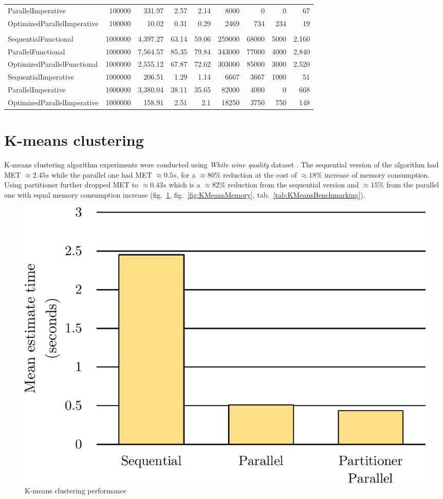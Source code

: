 \begin{table}
\begin{tabularx}{\linewidth}{Xrrrrrrrr}
ParallelImperative	&	100000	&	331.97	&	2.57	&	2.14	&	8000	&	0	&	0	&	67	\\
OptimizedParallelImperative	&	100000	&	10.02	&	0.31	&	0.29	&	2469	&	734	&	234	&	19	\\
&&&&&&&&\\
SequentialFunctional	&	1000000	&	4,397.27	&	63.14	&	59.06	&	259000	&	68000	&	5000	&	2,160	\\
ParallelFunctional	&	1000000	&	7,564.57	&	85.35	&	79.84	&	343000	&	77000	&	4000	&	2,840	\\
OptimizedParallelFunctional	&	1000000	&	2,555.12	&	67.87	&	72.62	&	303000	&	85000	&	3000	&	2,520	\\
SequentialImperative	&	1000000	&	206.51	&	1.29	&	1.14	&	6667	&	3667	&	1000	&	51	\\
ParallelImperative	&	1000000	&	3,380.04	&	38.11	&	35.65	&	82000	&	4000	&	0	&	668	\\
OptimizedParallelImperative	&	1000000	&	158.91	&	2.51	&	2.1	&	18250	&	3750	&	750	&	148	\\
			\bottomrule
    \end{tabularx}
\end{table}

\clearpage
\section{K-means clustering}
\label{sec: K-means}
K-means clustering algorithm experiments were conducted using \emph{White 
wine quality} dataset \cite{WhiteWine}. The sequential version of the algorithm 
had MET $\approx 2.45s$ while the parallel one had MET $\approx 0.5s$, for a $
\approx 80\%$ reduction at the cost of $\approx 18\%$ increase of memory 
consumption. Using partitioner further dropped MET to $\approx 0.43s$
 which is a $\approx 82\%$ reduction from the sequential version and $\approx 
15\%$ from the parallel one with equal memory consumption increase (fig.~\ref{fig:KMeansPerformance}, fig.~\ref{fig:KMeansMemory}, tab.~\ref{tab:KMeansBenchmarking}).

\begin{figure}[htb]
\centering
\includegraphics[width=.62\linewidth]{figures04/KMeans.pdf}
\caption{K-means clustering  performance}
\label{fig:KMeansPerformance}
\end{figure}


